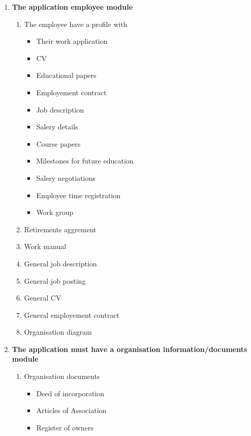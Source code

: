 \begin{enumerate}
\begin{enumerate}
\begin{enumerate}
            \item \textbf{The application employee module}
            \begin{enumerate}
                \item The employee have a profile with
                \begin{itemize}
                    \item Their work application
                    \item CV
                    \item Educational papers
                    \item Employement contract
                    \item Job description
                    \item Salery details
                    \item Course papers
                    \item Milestones for future education
                    \item Salery negotiations
                    \item Employee time registration
                    \item Work group
                \end{itemize}
                \item Retirements aggrement
                \item Work manual
                \item General job description
                \item General job posting
                \item General CV
                \item General employement contract
                \item Organisation diagram
            \end{enumerate}
            \item \textbf{The application must have a organisation information/documents module}
            \begin{enumerate}
                \item Organisation documents
                \begin{itemize}
                    \item Deed of incorporation
                    \item Articles of Association
                    \item Register of owners

\end{itemize}
\end{enumerate}
\end{enumerate}
\end{enumerate}
\end{enumerate}
